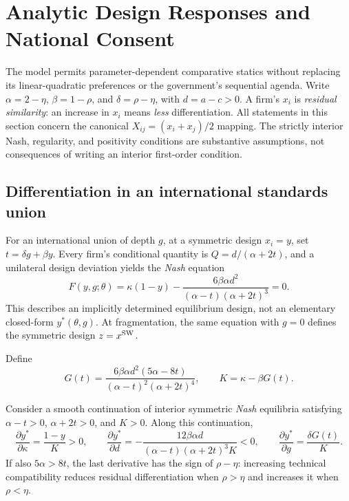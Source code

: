 \section{Analytic Design Responses and National Consent}\label{sec:analytic}

The model permits parameter-dependent comparative statics without replacing
its linear-quadratic preferences or the government's sequential agenda.
Write $\alpha=2-\eta$, $\beta=1-\rho$, and $\delta=\rho-\eta$,
with $d=a-c>0$. A firm's $x_i$ is \emph{residual similarity}:
an increase in $x_i$ means \emph{less} differentiation.
All statements in this section concern the canonical
$X_{ij}=(x_i+x_j)/2$ mapping. The strictly interior Nash,
regularity, and positivity conditions are substantive assumptions,
not consequences of writing an interior first-order condition.

\subsection{Differentiation in an international standards union}

For an international union of depth $g$, at a symmetric design
$x_i=y$, set $t=\delta g+\beta y$. Every firm's conditional
quantity is $Q=d/(\alpha+2t)$, and a unilateral design
deviation yields the \emph{Nash} equation
\begin{equation}\label{eq:analytic-is-foc}
 F(y,g;\theta)=\kappa(1-y)-
 \frac{6\beta\alpha d^2}{(\alpha-t)(\alpha+2t)^3}=0.
\end{equation}
This describes an implicitly determined equilibrium design,
not an elementary closed-form $y^*(\theta,g)$.
At fragmentation, the same equation with $g=0$ defines the
symmetric design $z=x^{\mathrm{SW}}$.

Define
\begin{equation}\label{eq:analytic-GK}
 G(t)=\frac{6\beta\alpha d^2(5\alpha-8t)}
 {(\alpha-t)^2(\alpha+2t)^4},\qquad
 K=\kappa-\beta G(t).
\end{equation}

\begin{proposition}\label{prop:analytic-A}
Consider a smooth continuation of interior symmetric
\emph{Nash} equilibria satisfying
$\alpha-t>0$, $\alpha+2t>0$, and $K>0$.
Along this continuation,
\begin{equation}\label{eq:analytic-A}
 \frac{\partial y^*}{\partial\kappa}=\frac{1-y}{K}>0,\qquad
 \frac{\partial y^*}{\partial d}
 =-\frac{12\beta\alpha d}
 {(\alpha-t)(\alpha+2t)^3K}<0,\qquad
 \frac{\partial y^*}{\partial g}=\frac{\delta G(t)}{K}.
\end{equation}
If also $5\alpha>8t$, the last derivative has the
sign of $\rho-\eta$: increasing technical compatibility
reduces residual differentiation when $\rho>\eta$ and
increases it when $\rho<\eta$.
\end{proposition}

